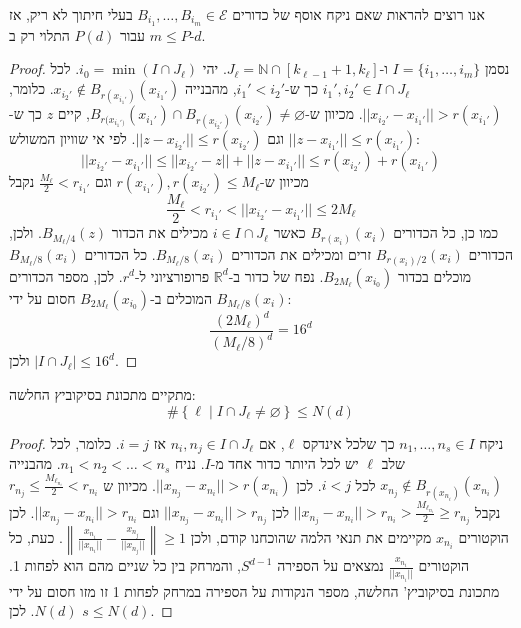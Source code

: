 \documentclass{tstextbook}
\begin{document}
\begin{lemma}
אנו רוצים להראות שאם ניקח אוסף של כדורים \(B_{i_1}, \dots, B_{i_m} \in \mathcal{E}\) בעלי חיתוך לא ריק, אז \(m \leq P\) עבור \(P(d)\) התלוי רק ב-\(d\). 

\end{lemma}
\begin{proof}
נסמן \(I = \{i_1, \dots, i_m\}\) ו-\(J_\ell = \mathbb{N} \cap [k_{\ell-1}+1, k_\ell]\).
יהי \(i_0 = \min(I \cap J_\ell)\). לכל \(i_1', i_2' \in I \cap J_\ell\) כך ש-\(i_1' < i_2'\), מהבנייה \(x_{i_2'} \notin B_{r(x_{i_1'})}(x_{i_1'})\). כלומר, \(||x_{i_2'} - x_{i_1'}|| > r(x_{i_1'})\).
מכיוון ש-\(B_{r(x_{i_1')}}(x_{i_1'}) \cap B_{r(x_{i_2'})}(x_{i_2'}) \neq \varnothing\), קיים \(z\) כך ש-\(||z - x_{i_1'}|| \leq r(x_{i_1'})\) וגם \(||z - x_{i_2'}|| \leq r(x_{i_2'})\). לפי אי שוויון המשולש:
$$ ||x_{i_2'} - x_{i_1'}|| \le ||x_{i_2'} - z|| + ||z - x_{i_1'}|| \le r(x_{i_2'}) + r(x_{i_1'}) $$
מכיוון ש-\(r(x_{i_1'}), r(x_{i_2'}) \le M_\ell\) וגם \(\frac{M_\ell}{2}< r_{i_{1}'}\) נקבל  \\
$$ \frac{M_\ell}{2} < r_{i_1'} < ||x_{i_2'} - x_{i_1'}|| \le 2M_\ell $$
כמו כן, כל הכדורים \(B_{r(x_i)}(x_i)\) כאשר \(i \in I \cap J_\ell\) מכילים את הכדור \(B_{M_\ell/4}(z)\). ולכן, הכדורים \(B_{r(x_i)/2}(x_i)\) זרים ומכילים את הכדורים \(B_{M_\ell/8}(x_i)\). כל הכדורים \(B_{M_\ell/8}(x_i)\) מוכלים בכדור \(B_{2M_\ell}(x_{i_0})\).
נפח של כדור ב-\(\mathbb{R}^d\) פרופורציוני ל-\(r^d\). לכן, מספר הכדורים \(B_{M_\ell/8}(x_i)\) המוכלים ב-\(B_{2M_\ell}(x_{i_0})\) חסום על ידי:
$$ \frac{(2M_\ell)^d}{(M_\ell/8)^d} = 16^d $$
ולכן \(|I \cap J_\ell| \leq 16^d\).

\end{proof}
\begin{lemma}
מתקיים מתכונת בסיקוביץ החלשה:
$$\#\left\{  \ell \mid I\cap J_{\ell}\neq \varnothing   \right\}\leq N(d)$$

\end{lemma}
\begin{proof}
ניקח \(n_1, \dots, n_s \in I\) כך שלכל אינדקס \(\ell\), אם \(n_i, n_j \in I \cap J_\ell\) אז \(i=j\). כלומר, לכל שלב \(\ell\) יש לכל היותר כדור אחד מ-\(I\). נניח \(n_1 < n_2 < \dots < n_s\). מהבנייה \(x_{n_j} \notin B_{r(x_{n_i})}(x_{n_i})\) לכל \(i<j\). לכן \(||x_{n_j} - x_{n_i}|| > r(x_{n_i})\).
מכיוון ש \(r_{n_{j}}\leq \frac{M_{\ell_{n_{i}}}}{2}<r_{n_{i}}\) נקבל \(||x_{n_j} - x_{n_i}|| > r_{n_i} > \frac{M_{\ell_{n_i}}}{2} \ge r_{n_j}\)
לכן \(||x_{n_j} - x_{n_i}|| > r_{n_j}\) וגם \(||x_{n_j} - x_{n_i}|| > r_{n_i}\).
לכן הוקטורים \(x_{n_i}\) מקיימים את תנאי הלמה שהוכחנו קודם, ולכן \(\left\| \frac{x_{n_i}}{||x_{n_i}||} - \frac{x_{n_j}}{||x_{n_j}||} \right\| \geq 1\).
כעת, כל הוקטורים \(\frac{x_{n_i}}{||x_{n_i}||}\) נמצאים על הספירה \(S^{d-1}\), והמרחק בין כל שניים מהם הוא לפחות 1. מתכונת בסיקוביץ' החלשה, מספר הנקודות על הספירה במרחק לפחות 1 זו מזו חסום על ידי \(N(d)\). לכן \(s \leq N(d)\).

\end{proof}
\end{document}
